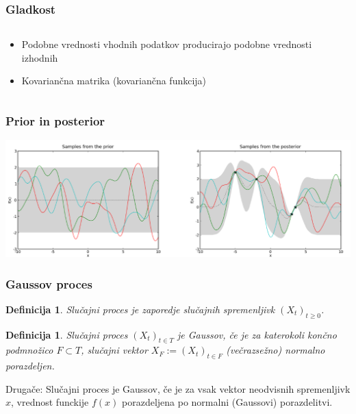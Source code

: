 \documentclass{beamer}
\newtheorem{proposition}[theorem]{Definicija}
\begin{document}
\begin{frame}

\frametitle{Gladkost}
\begin{columns}
\begin{column}{12cm}

\begin{itemize}
\item Podobne vrednosti vhodnih podatkov producirajo podobne vrednosti izhodnih
\item \alert{Kovariančna matrika} (kovariančna funkcija)

\end{itemize}

\end{column}


\end{columns}
\end{frame}
\begin{frame}

\frametitle{Prior in posterior}
\includegraphics[scale=0.35]{pripost}

\end{frame}






\begin{frame}

\frametitle{Gaussov proces}

\begin{proposition} 
\alert{Slučajni proces} je zaporedje slučajnih spremenljivk $(X_t)_{t\ge0 } $.
\end{proposition}

\begin{proposition}
Slučajni proces $(X_t)_{t \in T } $ je \alert{Gaussov}, če je za katerokoli končno podmnožico $ F \subset T$, slučajni vektor $ X_F := (X_t)_{t \in F}$ (večrazsežno) normalno porazdeljen. 
\end{proposition}

Drugače: Slučajni proces je Gaussov, če je za vsak vektor neodvisnih spremenljivk $x$, vrednost funckije $f(x)$ porazdeljena po normalni (Gaussovi) porazdelitvi.
\end{frame}
\end{document}
